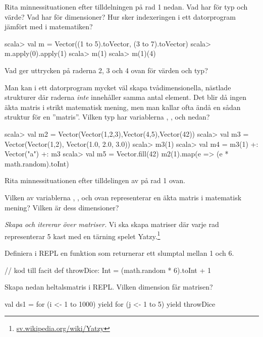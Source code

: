 \Subtask\Pen Rita minnessituationen efter tilldelningen på rad 1 nedan. Vad har  för typ och värde? Vad har  för dimensioner? Hur sker indexeringen i ett datorprogram jämfört med i matematiken?

\begin{REPL}
scala> val m = Vector((1 to 5).toVector, (3 to 7).toVector)
scala> m.apply(0).apply(1)
scala> m(1)
scala> m(1)(4)
\end{REPL}

\Subtask Vad ger uttrycken på raderna 2, 3 och 4 ovan för värden och typ? 

\Subtask Man kan i ett datorprogram mycket väl skapa tvådimensionella, nästlade strukturer där raderna \emph{inte} innehåller samma antal element. Det blir då ingen äkta matris i strikt matematisk mening, men man kallar ofta ändå en sådan struktur för en ''matris''. Vilken typ har variablerna , ,  och  nedan? 

\begin{REPL}
scala> val m2 = Vector(Vector(1,2,3),Vector(4,5),Vector(42))
scala> val m3 = Vector(Vector(1,2), Vector(1.0, 2.0, 3.0))
scala> m3(1)
scala> val m4 = m3(1) +: Vector("a") +: m3
scala> val m5 = Vector.fill(42){ m2(1).map(e => (e * math.random).toInt) }
\end{REPL}

\Subtask\Pen Rita minnessituationen efter tilldelingen av  på rad 1 ovan.

\Subtask\Pen Vilken av variablerna , ,  och  ovan representerar en äkta matris i matematisk mening? Vilken är dess dimensioner?



\Task \emph{Skapa och itererar över matriser.} Vi ska skapa matriser där varje rad representerar 5 kast med en tärning spelet Yatzy.\footnote{\href{https://sv.wikipedia.org/wiki/Yatzy}{sv.wikipedia.org/wiki/Yatzy}}


\Subtask Definiera i REPL en funktion  som returnerar ett slumptal mellan 1 och 6.
\begin{Code}
// kod till facit
def throwDice: Int = (math.random * 6).toInt + 1
\end{Code}


\Subtask Skapa nedan heltalsmatris i REPL. Vilken dimension får matrisen?
\begin{REPL}
val ds1 = for (i <- 1 to 1000) yield { 
            for (j <- 1 to 5) yield throwDice 
          }
\end{REPL}

